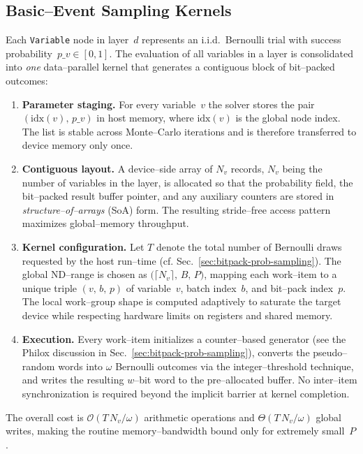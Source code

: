 
\subsection{Basic--Event Sampling Kernels}
\label{subsec:be_kernel}

Each \texttt{Variable} node in layer~$d$ represents an i.i.d.~Bernoulli trial
with success probability~$p\_v\in[0,1]$.  The evaluation of all variables in
a layer is consolidated into 
\emph{one} data--parallel kernel that generates a contiguous block of
bit--packed outcomes:
\begin{enumerate}
  \item \textbf{Parameter staging.}  For every variable~$v$ the solver stores the
        pair $(\text{idx}(v),\,p\_v)$ in host memory, where
        $\text{idx}(v)$ is the global node index.  The list is stable across
        Monte--Carlo iterations and is therefore transferred to device memory
        only once.
  \item \textbf{Contiguous layout.}  A device--side array of $N_{\!v}$
        records, $N_{\!v}$ being the number of variables in the layer, is
        allocated so that the probability field, the bit--packed result buffer
        pointer, and any auxiliary counters are stored in
        \emph{structure--of--arrays} (SoA) form.  The resulting stride--free
        access pattern maximizes global--memory throughput.
  \item \textbf{Kernel configuration.}  Let $T$ denote the total number of
        Bernoulli draws requested by the host run--time (cf.
        Sec.~\ref{sec:bitpack-prob-sampling}).  The global ND--range is chosen
        as $\bigl(\lceil N_{\!v}\rceil,\,B,\,P\bigr)$, mapping each work--item
        to a unique triple $(v,\,b,\,p)$ of variable~$v$, batch index~$b$, and
        bit--pack index~$p$.  The local work--group shape is computed
        adaptively to saturate the target device while respecting hardware
        limits on registers and shared memory.
  \item \textbf{Execution.}  Every work--item initializes a counter--based
        generator (see the Philox discussion in
        Sec.~\ref{sec:bitpack-prob-sampling}), converts the pseudo--random words
        into $\omega$ Bernoulli outcomes via the integer--threshold technique,
        and writes the resulting $w$--bit word to the pre--allocated buffer.
        No inter--item synchronization is required beyond the implicit barrier
        at kernel completion.
\end{enumerate}
The overall cost is $\mathcal{O}(T\,N_{\!v}/\omega)$ arithmetic operations and
$\Theta(T\,N_{\!v}/\omega)$ global writes, making the routine
memory--bandwidth bound only for extremely small~$P$.

